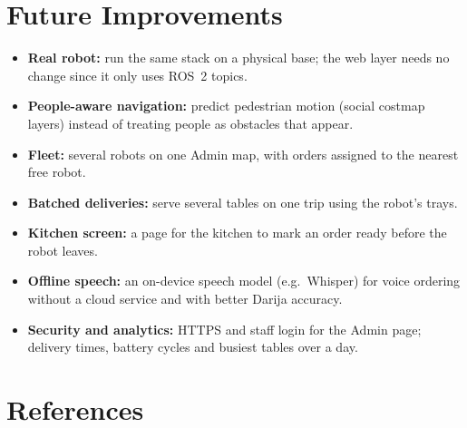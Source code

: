 \documentclass[11pt,a4paper]{article}
\begin{document}
\section{Future Improvements}

\begin{itemize}
  \item \textbf{Real robot:} run the same stack on a physical base; the web layer needs no change since it only uses ROS~2 topics.
  \item \textbf{People-aware navigation:} predict pedestrian motion (social costmap layers) instead of treating people as obstacles that appear.
  \item \textbf{Fleet:} several robots on one Admin map, with orders assigned to the nearest free robot.
  \item \textbf{Batched deliveries:} serve several tables on one trip using the robot's trays.
  \item \textbf{Kitchen screen:} a page for the kitchen to mark an order ready before the robot leaves.
  \item \textbf{Offline speech:} an on-device speech model (e.g.\ Whisper) for voice ordering without a cloud service and with better Darija accuracy.
  \item \textbf{Security and analytics:} HTTPS and staff login for the Admin page; delivery times, battery cycles and busiest tables over a day.
\end{itemize}

\section*{References}
\end{document}
